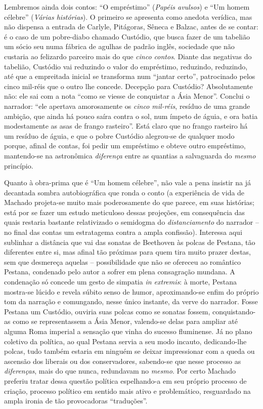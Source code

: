 Lembremos ainda dois contos: ``O empréstimo'' (\emph{Papéis avulsos}) e
``Um homem célebre'' (\emph{Várias histórias}). O primeiro se apresenta
como anedota verídica, mas não dispensa a entrada de Carlyle, Pitágoras,
Sêneca e Balzac, antes de se contar: é o caso de um pobre-diabo chamado
Custódio, que busca fazer de um tabelião um sócio seu numa fábrica de
agulhas de padrão inglês, sociedade que não custaria ao felizardo
parceiro mais do que \emph{cinco contos}. Diante das negativas do
tabelião, Custódio vai reduzindo o valor do empréstimo, reduzindo,
reduzindo, até que a empreitada inicial se transforma num ``jantar
certo'', patrocinado pelos cinco mil-réis que o outro lhe concede.
Decepção para Custódio? Absolutamente não: ele sai com a nota ``como se
viesse de conquistar a Ásia Menor''. Conclui o narrador: ``ele apertava
amorosamente os \emph{cinco mil-réis}, resíduo de uma grande ambição,
que ainda há pouco saíra contra o sol, num ímpeto de águia, e ora batia
modestamente as asas de frango rasteiro''. Está claro que no frango
rasteiro há um resíduo de águia, e que o pobre Custódio alegrou-se de
qualquer modo porque, afinal de contas, foi pedir um empréstimo e obteve
outro empréstimo, mantendo-se na astronômica \emph{diferença} entre as
quantias a salvaguarda do \emph{mesmo} princípio.

Quanto à obra-prima que é ``Um homem célebre'', não vale a pena insistir
na já decantada sombra autobiográfica que ronda o conto (a experiência
de vida de Machado projeta-se muito mais poderosamente do que parece, em
suas histórias; está por se fazer um estudo meticuloso dessas projeções,
em consequência das quais restaria bastante relativizado o semidogma do
\emph{distanciamento} do narrador -- no final das contas um estratagema
contra a ampla confissão). Interessa aqui sublinhar a distância que vai
das sonatas de Beethoven às polcas de Pestana, tão diferentes entre si,
mas afinal tão próximas para quem tira muito prazer destas, sem que
desmereça aquelas -- possibilidade que não se ofereceu ao romântico
Pestana, condenado pelo autor a sofrer em plena consagração mundana. A
condenação só concede um gesto de simpatia \emph{in extremis}: à morte,
Pestana mostra-se lúcido e revela súbito senso de humor, aproximando-se
enfim do próprio tom da narração e comungando, nesse único instante, da
verve do narrador. Fosse Pestana um Custódio, ouviria suas polcas como
se sonatas fossem, conquistando-as como se representassem a Ásia Menor,
valendo-se delas para ampliar até alguma Roma imperial a sensação que
vinha do sucesso fluminense. Já no plano coletivo da política, ao qual
Pestana servia a seu modo incauto, dedicando-lhe polcas, tudo também
estaria em ninguém se deixar impressionar com a queda ou ascensão dos
liberais ou dos conservadores, sabendo-se que nesse processo as
\emph{diferenças}, mais do que nunca, redundavam no \emph{mesmo}. Por
certo Machado preferiu tratar dessa questão política espelhando-a em seu
próprio processo de criação, processo político em sentido mais ativo e
problemático, resguardado na ampla ironia de tão provocadoras
``traduções''.

